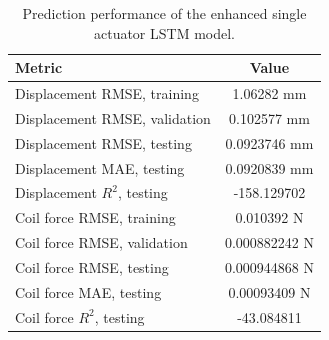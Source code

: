 \begin{table}[H]
\centering
\caption{Prediction performance of the enhanced single actuator LSTM model.}
\label{tab:lstm_prediction_metrics_enhanced}
\begin{tabular}{l c}
\hline
Metric & Value \\ 
\hline
Displacement RMSE, training & 1.06282 mm \\ 
Displacement RMSE, validation & 0.102577 mm \\ 
Displacement RMSE, testing & 0.0923746 mm \\ 
Displacement MAE, testing & 0.0920839 mm \\ 
Displacement $R^2$, testing & -158.129702 \\ 
Coil force RMSE, training & 0.010392 N \\ 
Coil force RMSE, validation & 0.000882242 N \\ 
Coil force RMSE, testing & 0.000944868 N \\ 
Coil force MAE, testing & 0.00093409 N \\ 
Coil force $R^2$, testing & -43.084811 \\ 
\hline
\end{tabular}
\end{table}
